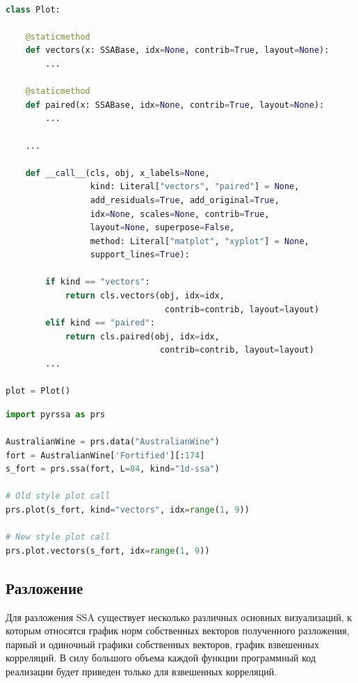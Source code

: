 \documentclass[specialist,
			   substylefile = spbu_report.rtx,
			   subf,href,colorlinks=true, 12pt]{disser}
\begin{document}
\begin{lstlisting}[language=Python, caption=Структура для функций визуализации в пакете pyrssa.]

class Plot:

    @staticmethod
    def vectors(x: SSABase, idx=None, contrib=True, layout=None):
        ...
        
    @staticmethod
    def paired(x: SSABase, idx=None, contrib=True, layout=None):
        ...
        
    ...
    
    def __call__(cls, obj, x_labels=None,
                 kind: Literal["vectors", "paired"] = None,
                 add_residuals=True, add_original=True,
                 idx=None, scales=None, contrib=True,
                 layout=None, superpose=False,
                 method: Literal["matplot", "xyplot"] = None,
                 support_lines=True):
                 
        if kind == "vectors":
            return cls.vectors(obj, idx=idx,
                                contrib=contrib, layout=layout)
        elif kind == "paired":
            return cls.paired(obj, idx=idx,
                               contrib=contrib, layout=layout)
        ...
        
plot = Plot()
\end{lstlisting}

\begin{lstlisting}[language=Python, caption=Различные возможности обращения к функциям визуализации в Python.]
import pyrssa as prs

AustralianWine = prs.data("AustralianWine")
fort = AustralianWine['Fortified'][:174]
s_fort = prs.ssa(fort, L=84, kind="1d-ssa")

# Old style plot call
prs.plot(s_fort, kind="vectors", idx=range(1, 9))

# New style plot call
prs.plot.vectors(s_fort, idx=range(1, 9))
\end{lstlisting}

\subsection{Разложение}

Для разложения SSA существует несколько различных основных визуализаций, к которым относятся график норм собственных векторов полученного разложения, парный и одиночный графики собственных векторов, график взвешенных корреляций. В силу большого объема каждой функции программный код реализации будет приведен только для взвешенных корреляций.
\end{document}
